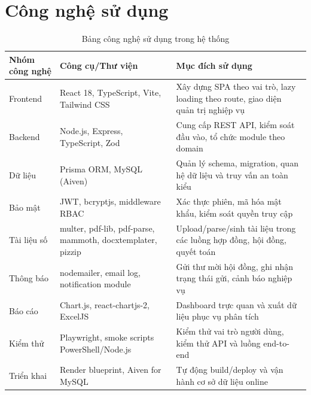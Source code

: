 \documentclass[12pt,a4paper]{report}
\begin{document}
\section{Công nghệ sử dụng}
\begin{table}[H]
\centering
\small
\begin{tabular}{|L{2.8cm}|L{4.0cm}|L{6.4cm}|}
\hline
\textbf{Nhóm công nghệ} & \textbf{Công cụ/Thư viện} & \textbf{Mục đích sử dụng} \\ \hline
Frontend & React 18, TypeScript, Vite, Tailwind CSS & Xây dựng SPA theo vai trò, lazy loading theo route, giao diện quản trị nghiệp vụ \\ \hline
Backend & Node.js, Express, TypeScript, Zod & Cung cấp REST API, kiểm soát đầu vào, tổ chức module theo domain \\ \hline
Dữ liệu & Prisma ORM, MySQL (Aiven) & Quản lý schema, migration, quan hệ dữ liệu và truy vấn an toàn kiểu \\ \hline
Bảo mật & JWT, bcryptjs, middleware RBAC & Xác thực phiên, mã hóa mật khẩu, kiểm soát quyền truy cập \\ \hline
Tài liệu số & multer, pdf-lib, pdf-parse, mammoth, docxtemplater, pizzip & Upload/parse/sinh tài liệu trong các luồng hợp đồng, hội đồng, quyết toán \\ \hline
Thông báo & nodemailer, email log, notification module & Gửi thư mời hội đồng, ghi nhận trạng thái gửi, cảnh báo nghiệp vụ \\ \hline
Báo cáo & Chart.js, react-chartjs-2, ExcelJS & Dashboard trực quan và xuất dữ liệu phục vụ phân tích \\ \hline
Kiểm thử & Playwright, smoke scripts PowerShell/Node.js & Kiểm thử vai trò người dùng, kiểm thử API và luồng end-to-end \\ \hline
Triển khai & Render blueprint, Aiven for MySQL & Tự động build/deploy và vận hành cơ sở dữ liệu online \\ \hline
\end{tabular}
\caption{Bảng công nghệ sử dụng trong hệ thống}
\end{table}
\end{document}
